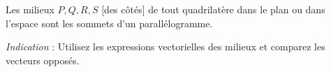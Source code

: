 Les milieux $P, Q, R, S$ [des côtés] de tout quadrilatère dans le plan ou
dans l'espace sont les sommets d'un parallélogramme.

\emph{Indication} : Utilisez les expressions vectorielles des milieux et
comparez les vecteurs opposés.

